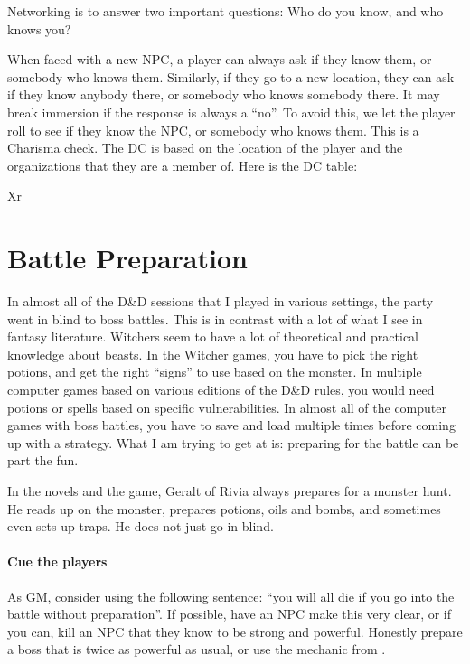 \documentclass[twocolumn]{dndbook}
\begin{document}
\begin{emphasisParagraph}
	Networking is to answer two important questions:
	Who do you know, and who knows you?
\end{emphasisParagraph}

When faced with a new NPC, a player can always ask if they know them, or somebody who knows them.
Similarly, if they go to a new location, they can ask if they know anybody there, or somebody who knows somebody there.
It may break immersion if the response is always a ``no''.
To avoid this, we let the player roll to see if they know the NPC, or somebody who knows them.
This is a Charisma check.
The DC is based on the location of the player and the organizations that they are a member of.
Here is the DC table:

\begin{DndTable}[header=Networking DC]{Xr}
\end{DndTable}


\section{Battle Preparation}
\label{sec:battle_preparation}

In almost all of the D\&D sessions that I played in various settings, the party went in blind to boss battles.
This is in contrast with a lot of what I see in fantasy literature.
Witchers seem to have a lot of theoretical and practical knowledge about beasts.
In the Witcher games, you have to pick the right potions, and get the right ``signs'' to use based on the monster.
In multiple computer games based on various editions of the D\&D rules, you would need potions or spells based on specific vulnerabilities.
In almost all of the computer games with boss battles, you have to save and load multiple times before coming up with a strategy.
What I am trying to get at is: preparing for the battle can be part the fun.\par

\begin{emphasisParagraph}
	In the novels and the game, Geralt of Rivia always prepares for a monster hunt.
	He reads up on the monster, prepares potions, oils and bombs,
	and sometimes even sets up traps.
	He does not just go in blind.
\end{emphasisParagraph}

\paragraph*{Cue the players}
As GM, consider using the following sentence: ``you will all die if you go into the battle without preparation''.
If possible, have an NPC make this very clear, or if you can, kill an NPC that they know to be strong and powerful.
Honestly prepare a boss that is twice as powerful as usual, or use the mechanic from .\par
\end{document}
